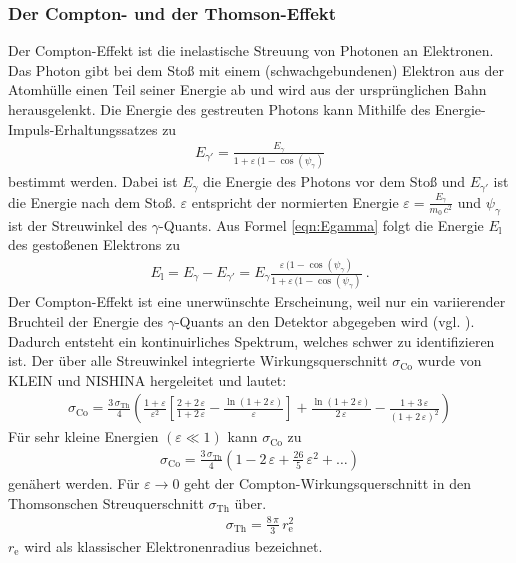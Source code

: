 \subsubsection{Der Compton- und der Thomson-Effekt}
Der Compton-Effekt ist die inelastische Streuung von Photonen an Elektronen. Das Photon gibt bei dem Stoß mit einem (schwachgebundenen) Elektron aus der Atomhülle einen Teil seiner Energie ab und wird aus der ursprünglichen Bahn herausgelenkt. Die Energie des gestreuten Photons kann Mithilfe des Energie-Impuls-Erhaltungssatzes zu
\begin{align}
	E_{\gamma'} = \frac{E_{\gamma}}{1 + \varepsilon\,(1-\cos(\psi_{\gamma})}
	\label{eqn:Egamma}
\end{align}
bestimmt werden. Dabei ist $E_{\gamma}$ die Energie des Photons vor dem Stoß und $E_{\gamma'}$ ist die Energie nach dem Stoß. $\varepsilon$ entspricht der normierten Energie $\varepsilon = \frac{E_{\gamma}}{m_0\,c^2}$ und $\psi_{\gamma}$ ist der Streuwinkel des $\gamma$-Quants. Aus Formel \eqref{eqn:Egamma} folgt die Energie $E_\text{l}$ des gestoßenen Elektrons zu
\begin{align}
	E_\text{l} = E_{\gamma} - E_{\gamma'} = E_{\gamma} \frac{\varepsilon\,(1-\cos(\psi_{\gamma})}{1 + \varepsilon\,(1-\cos(\psi_{\gamma})} \ .
	\label{eqn:El}
\end{align}
Der Compton-Effekt ist eine unerwünschte Erscheinung, weil nur ein variierender Bruchteil der Energie des $\gamma$-Quants an den Detektor abgegeben wird (vgl. \cite[5]{V18}). Dadurch entsteht ein kontinuirliches Spektrum, welches schwer zu identifizieren ist. Der über alle Streuwinkel integrierte Wirkungsquerschnitt $\sigma_\text{Co}$ wurde von KLEIN und NISHINA hergeleitet und lautet:
\begin{align}
	\sigma_\text{Co} = \frac{3\,\sigma_\text{Th}}{4} \left( \frac{1+\varepsilon}{\varepsilon^2} \left[\frac{2+2\,\varepsilon}{1+2\,\varepsilon} - \frac{\ln(1+2\,\varepsilon)}{\varepsilon} \right] + \frac{\ln(1+2\,\varepsilon)}{2\,\varepsilon} - \frac{1+3\,\varepsilon}{(1+2\,\varepsilon)^2} \right)
\end{align}
Für sehr kleine Energien $(\varepsilon \ll 1)$ kann $\sigma_\text{Co}$ zu
\begin{align}
	\sigma_\text{Co} = \frac{3\,\sigma_\text{Th}}{4} \left(1 - 2\,\varepsilon + \frac{26}{5}\,\varepsilon^2 + \dots \right)
\end{align}
genähert werden. Für $\varepsilon \rightarrow 0$ geht der Compton-Wirkungsquerschnitt in den Thomsonschen Streuquerschnitt $\sigma_\text{Th}$ über.
\begin{align}
	\sigma_\text{Th} = \frac{8\,\pi}{3}\,r_\text{e}^2
\end{align}
$r_\text{e}$ wird als klassischer Elektronenradius bezeichnet.



